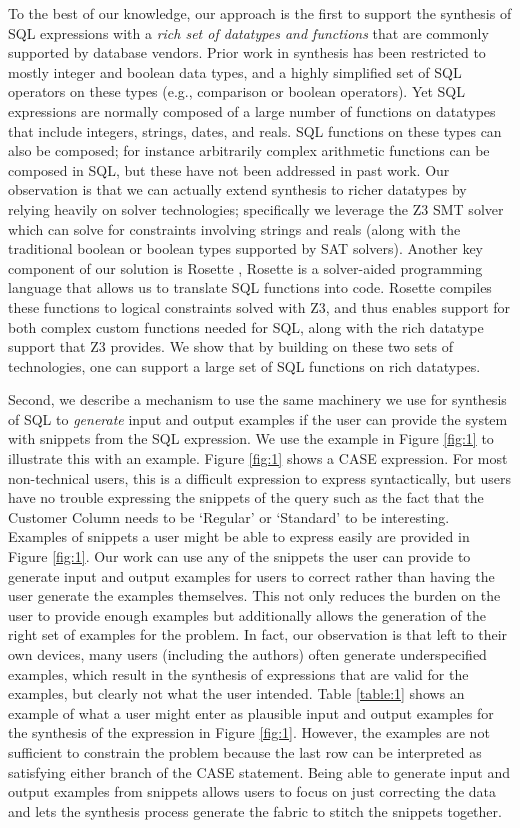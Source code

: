 To the best of our knowledge, our approach is the first to support the synthesis of SQL expressions with a \emph{rich set of datatypes and functions} that are commonly supported by database vendors.  Prior work in synthesis has been restricted to mostly integer and boolean data types, and a highly simplified set of SQL operators on these types (e.g., comparison or boolean operators).  Yet SQL expressions are normally composed of a large number of functions on datatypes that include integers, strings, dates, and reals.  SQL functions on these types can also be composed; for instance arbitrarily complex arithmetic functions can be composed in SQL, but these have not been addressed in past work.  Our observation is that we can actually extend synthesis to richer datatypes by relying heavily on solver technologies; specifically we leverage the Z3 SMT solver \cite{Z3} which can solve for constraints involving strings and reals (along with the traditional boolean or boolean types supported by SAT solvers).  Another key component of our solution is Rosette \cite{Rosette}, Rosette is a solver-aided programming language that allows us to translate SQL functions into code.  Rosette compiles these functions to logical constraints solved with Z3, and thus enables support for both complex custom functions needed for SQL, along with the rich datatype support that Z3 provides. We show that by building on these two sets of technologies, one can support a large set of SQL functions on rich datatypes. 

Second, we describe a mechanism to use the same machinery we use for synthesis of SQL to \emph{generate} input and output examples if the user can provide the system with snippets from the SQL expression.  We use the example in Figure \ref{fig:1} to illustrate this with an example.  Figure \ref{fig:1} shows a CASE expression.  For most non-technical users, this is a difficult expression to express syntactically, but users have no trouble expressing the snippets of the query such as the fact that the Customer Column needs to be `Regular' or  `Standard' to be interesting.  Examples of snippets a user might be able to express easily are provided in Figure \ref{fig:1}.  Our work can use any of the snippets the user can provide to generate input and output examples for users to correct rather than having the user generate the examples themselves.  This not only reduces the burden on the user to provide enough examples but additionally allows the generation of the right set of examples for the problem.  In fact, our observation is that left to their own devices, many users (including the authors) often generate underspecified examples, which result in the synthesis of expressions that are valid for the examples, but clearly not what the user intended.  Table \ref{table:1} shows an example of what a user might enter as plausible input and output examples for the synthesis of the expression in Figure \ref{fig:1}.  However, the examples are not sufficient to constrain the problem because the last row can be interpreted as satisfying either branch of the CASE statement.  Being able to generate input and output examples from snippets allows users to focus on just correcting the data and lets the synthesis process generate the fabric to stitch the snippets together. 

